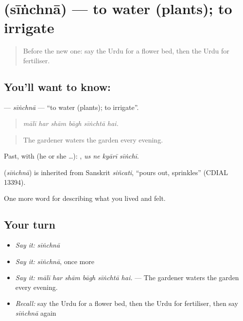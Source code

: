 \section[\texorpdfstring{\ur{سینچنا} (sīṅchnā)}{سینچنا (sīṅchnā)}]{ (sīṅchnā) — to water (plants); to irrigate}

\label{lesson:UR-C512-sinchna}



\begin{quote}
Before the new one: say the Urdu for a flower bed, then the Urdu for fertiliser.
\end{quote}

\subsection*{You'll want to know: }
\textbf{} — \emph{sīṅchnā} — \textquotedblleft{}to water (plants); to irrigate\textquotedblright{}.

\begin{quote}
     
\end{quote}

\begin{quote}
\emph{mālī har shām bāgh sīṅchtā hai.}
\end{quote}

\begin{quote}
The gardener waters the garden every evening.
\end{quote}

Past, with  (he or she …):    , \emph{us ne kyārī sīṅchī}.

\begin{cousinweb}
\textbf{} (\emph{sīṅchnā}) is inherited from Sanskrit \emph{siñcati}, \textquotedblleft{}pours out, sprinkles\textquotedblright{} (CDIAL 13394).
\end{cousinweb}

\begin{grammarlens}[title={What you've built}]
One more word for describing what you lived and felt.
\end{grammarlens}

\subsection*{Your turn}
\begin{itemize}
\raggedright
  \item \emph{Say it:} \emph{sīṅchnā}
  \item \emph{Say it:} \emph{sīṅchnā}, once more
  \item \emph{Say it:} \emph{mālī har shām bāgh sīṅchtā hai.} — The gardener waters the garden every evening.
  \item \emph{Recall:} say the Urdu for a flower bed, then the Urdu for fertiliser, then say \emph{sīṅchnā} again
\end{itemize}

